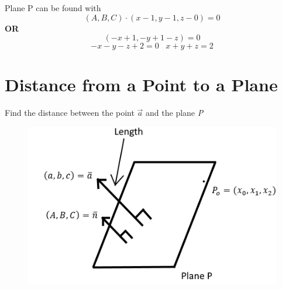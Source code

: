 \documentclass{article}
\begin{document}
Plane P can be found with
\[(A,B,C)\cdot (x-1,y-1,z-0)=0\]
\textbf{OR}
\[(-x+1,-y+1-z)=0\]
\[-x-y-z+2=0\;\;\; x+y+z=2\]

\section{Distance from a Point to a Plane}
Find the distance between the point $\vec{a}$ and the plane \textit{P}
\begin{figure}[h!]
    \centering
    \includegraphics[scale=0.5]{pointToPlane.png}
    \label{}
\end{figure}
\end{document}
